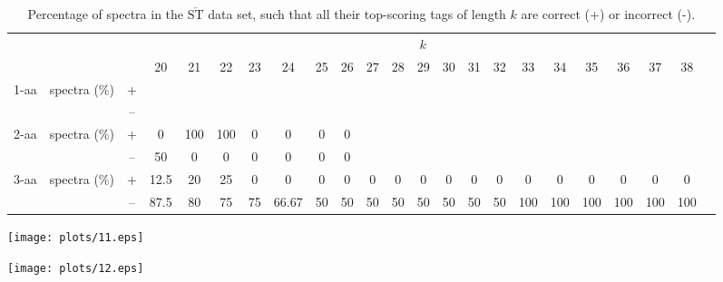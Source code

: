 \documentclass{article}
\def\STbar{{\overline{\mathrm{ST}}}}
\begin{document}
\begin{table}[ht]\footnotesize
\vspace{3mm}
{\centering
\begin{center}
\begin{tabular}{|c|cc|c|c|c|c|c|c|c|c|c|c|c|c|c|c|c|c|c|c|c|c|}
  \hline
  \multicolumn{3}{|c|}{ } & \multicolumn{ 19}{|c|}{$k$} \\
  \cline{4-22 }
  \multicolumn{3}{|c|}{ } 
 & 20 & 21 & 22 & 23 & 24 & 25 & 26 & 27 & 28 & 29 & 30 & 31 & 32 & 33 & 34 & 35 & 36 & 37 & 38\\
\hline
  \multirow{2}{*}{1-aa}& \multirow{2}{*}{spectra (\%)}  &  +
 &  &  &  &  &  &  &  &  &  &  &  &  &  &  &  &  &  &  & \\
 & 
 &  --
 &  &  &  &  &  &  &  &  &  &  &  &  &  &  &  &  &  &  & \\
\hline
  \multirow{2}{*}{2-aa}& \multirow{2}{*}{spectra (\%)}  &  +
 & 0 & 100 & 100 & 0 & 0 & 0 & 0 &  &  &  &  &  &  &  &  &  &  &  & \\
 & 
 &  --
 & 50 & 0 & 0 & 0 & 0 & 0 & 0 &  &  &  &  &  &  &  &  &  &  &  & \\
\hline
  \multirow{2}{*}{3-aa}& \multirow{2}{*}{spectra (\%)}  &  +
 & 12.5 & 20 & 25 & 0 & 0 & 0 & 0 & 0 & 0 & 0 & 0 & 0 & 0 & 0 & 0 & 0 & 0 & 0 & 0\\
 & 
 &  --
 & 87.5 & 80 & 75 & 75 & 66.67 & 50 & 50 & 50 & 50 & 50 & 50 & 50 & 50 & 100 & 100 & 100 & 100 & 100 & 100 \\
  \hline
\end{tabular}
\end{center}
\par}
\centering

\caption{Percentage of spectra in the $\STbar$ data set, such that all their top-scoring tags of length $k$ are correct (+) or incorrect (-).}

\vspace{3mm}
\label{table:all-top-scoring}
\end{table}
\texttt{[image: plots/11.eps]}

\texttt{[image: plots/12.eps]}
\end{document}
